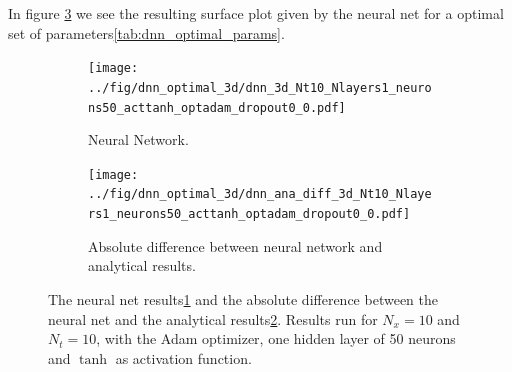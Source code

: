 In figure \ref{fig:3d-dnn-comparison-plots} we see the resulting surface plot given by the neural net for a optimal set of parameters\ref{tab:dnn_optimal_params}.
\begin{figure}[h!tb]
    \centering
    \begin{subfigure}{0.5\textwidth}
        \centering
        \texttt{[image: ../fig/dnn\_optimal\_3d/dnn\_3d\_Nt10\_Nlayers1\_neurons50\_acttanh\_optadam\_dropout0\_0.pdf]}
        \caption{Neural Network.}
        \label{fig:neural-net-optimal-3d}
    \end{subfigure} \qquad \qquad \qquad
    \begin{subfigure}{0.5\textwidth}
        \centering
        \texttt{[image: ../fig/dnn\_optimal\_3d/dnn\_ana\_diff\_3d\_Nt10\_Nlayers1\_neurons50\_acttanh\_optadam\_dropout0\_0.pdf]}
        \caption{Absolute difference between neural network and analytical results.}
        \label{fig:dnn-ana-diff-3d}
    \end{subfigure}
    \caption{The neural net results\ref{fig:neural-net-optimal-3d} and the absolute difference between the neural net and the analytical results\ref{fig:dnn-ana-diff-3d}. Results run for $N_x=10$ and $N_t=10$, with the Adam optimizer, one hidden layer of 50 neurons and $\tanh$ as activation function.}
    \label{fig:3d-dnn-comparison-plots}
\end{figure}



